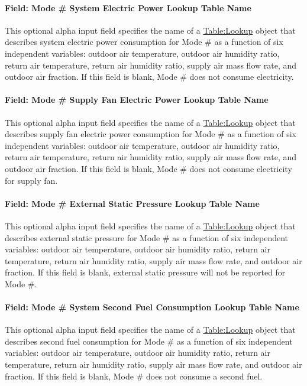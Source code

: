 \paragraph{Field: Mode \# System Electric Power Lookup Table Name}
This optional alpha input field specifies the name of a \hyperref[tablelookup]{Table:Lookup} object that describes system electric power consumption for Mode \# as a function of six independent variables: outdoor air temperature, outdoor air humidity ratio, return air temperature, return air humidity ratio, supply air mass flow rate, and outdoor air fraction. If this field is blank, Mode \# does not consume electricity.

\paragraph{Field: Mode \# Supply Fan Electric Power Lookup Table Name}
This optional alpha input field specifies the name of a \hyperref[tablelookup]{Table:Lookup} object that describes supply fan electric power consumption for Mode \# as a function of six independent variables: outdoor air temperature, outdoor air humidity ratio, return air temperature, return air humidity ratio, supply air mass flow rate, and outdoor air fraction. If this field is blank, Mode \# does not consume electricity for supply fan.

\paragraph{Field: Mode \# External Static Pressure Lookup Table Name}
This optional alpha input field specifies the name of a \hyperref[tablelookup]{Table:Lookup} object that describes external static pressure for Mode \# as a function of six independent variables: outdoor air temperature, outdoor air humidity ratio, return air temperature, return air humidity ratio, supply air mass flow rate, and outdoor air fraction. If this field is blank, external static pressure will not be reported for Mode \#.

\paragraph{Field: Mode \# System Second Fuel Consumption Lookup Table Name}
This optional alpha input field specifies the name of a \hyperref[tablelookup]{Table:Lookup} object that describes second fuel consumption for Mode \# as a function of six independent variables: outdoor air temperature, outdoor air humidity ratio, return air temperature, return air humidity ratio, supply air mass flow rate, and outdoor air fraction. If this field is blank, Mode \# does not consume a second fuel.

